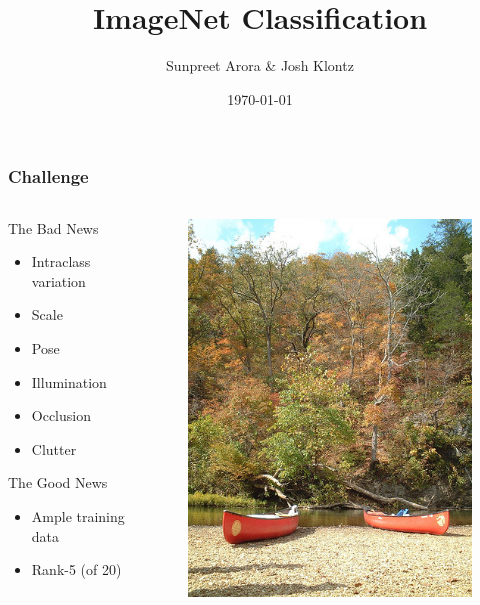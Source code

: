 \documentclass{beamer}
\title[ImageNet]{ImageNet Classification}
\author{Sunpreet Arora \& Josh Klontz}
\date{\today}
\begin{document}
%
\begin{frame}
\titlepage
\end{frame}
%
\begin{frame}
\frametitle{Challenge}
\begin{columns}
\begin{column}{.3\textwidth}
\begin{block}{The Bad News}
\begin{itemize}
\item Intraclass variation
\item Scale
\item Pose
\item Illumination
\item Occlusion
\item Clutter
\end{itemize}
\end{block}
\begin{block}{The Good News}
\begin{itemize}
\item Ample training data
\item Rank-5 (of 20)
\end{itemize}
\end{block}
\end{column}
\begin{column}{.3\textwidth}
\begin{figure}
\includegraphics[width=\textwidth]{n02951358_94}

\end{figure}
\end{column}
\end{columns}
\end{frame}
\end{document}
